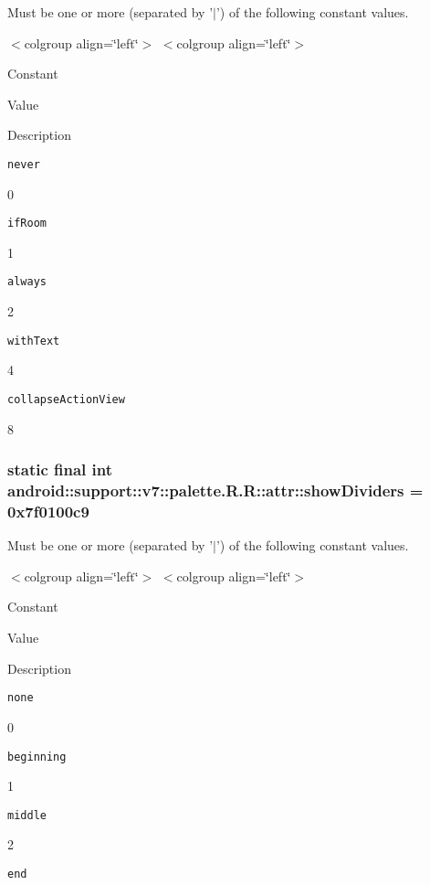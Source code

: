 Must be one or more (separated by '$|$') of the following constant values. \begin{TabularC}{0}
\hline
\end{TabularC}
$<$colgroup align=\char`\"{}left\char`\"{}$>$ $<$colgroup align=\char`\"{}left\char`\"{}$>$ 

Constant

Value

Description 

{\tt never}

0

{\tt ifRoom}

1

{\tt always}

2

{\tt withText}

4

{\tt collapseActionView}

8\hypertarget{classandroid_1_1support_1_1v7_1_1palette_1_1_r_1_1attr_c347212a0afb03e44f4df1bb0d80b87a}{
\subsubsection[{showDividers}]{\setlength{\rightskip}{0pt plus 5cm}static final int android::support::v7::palette.R.R::attr::showDividers = 0x7f0100c9}}
\label{classandroid_1_1support_1_1v7_1_1palette_1_1_r_1_1attr_c347212a0afb03e44f4df1bb0d80b87a}


Must be one or more (separated by '$|$') of the following constant values. \begin{TabularC}{0}
\hline
\end{TabularC}
$<$colgroup align=\char`\"{}left\char`\"{}$>$ $<$colgroup align=\char`\"{}left\char`\"{}$>$ 

Constant

Value

Description 

{\tt none}

0

{\tt beginning}

1

{\tt middle}

2

{\tt end}

